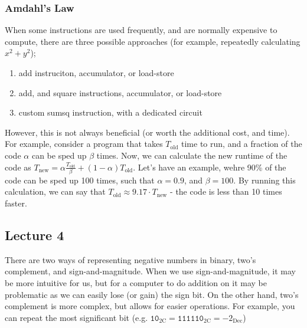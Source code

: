 \documentclass[a4paper, 12pt]{article}
\begin{document}
            \subsubsection*{Amdahl's Law}
                When some instructions are used frequently, and are normally expensive to compute, there are three possible approaches (for example, repeatedly calculating $x^2 + y^2$);
                \begin{enumerate}[1.]
                    \itemsep0em
                    \item add instruciton, accumulator, or load-store
                    \item add, and square instructions, accumulator, or load-store
                    \item custom sumsq instruction, with a dedicated circuit
                \end{enumerate}
                However, this is not always beneficial (or worth the additional cost, and time). For example, consider a program that takes $T_\text{old}$ time to run, and a fraction of the code $\alpha$ can be sped up $\beta$ times. Now, we can calculate the new runtime of the code as $T_\text{new} = \alpha \frac{T_\text{old}}{\beta} + (1 - \alpha)T_\text{old}$. Let's have an example, wehre 90\% of the code can be sped up 100 times, such that $\alpha = 0.9$, and $\beta = 100$. By running this calculation, we can say that $T_\text{old} \approx 9.17 \cdot T_\text{new}$ - the code is less than 10 times faster.
        \subsection*{Lecture 4}
            There are two ways of representing negative numbers in binary, two's complement, and sign-and-magnitude. When we use sign-and-magnitude, it may be more intuitive for us, but for a computer to do addition on it may be problematic as we can easily lose (or gain) the sign bit. On the other hand, two's complement is more complex, but allows for easier operations. For example, you can repeat the most significant bit (e.g. $\texttt{10}_\text{2C} = \texttt{111110}_\text{2C} = -2_\text{Dec}$)
            \medskip
\end{document}
